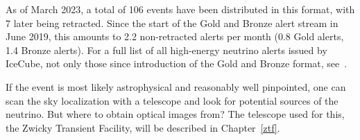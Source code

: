 As of March 2023, a total of 106 events have been distributed in this format, with 7 later being retracted. Since the start of the Gold and Bronze alert stream in June 2019, this amounts to 2.2 non-retracted alerts per month (0.8 Gold alerts, 1.4 Bronze alerts). For a full list of all high-energy neutrino alerts issued by IceCube, not only those since introduction of the Gold and Bronze format, see~\cite{Abbasi2023}.

If the event is most likely astrophysical and reasonably well pinpointed, one can scan the sky localization with a telescope and look for potential sources of the neutrino. But where to obtain optical images from? The telescope used for this, the Zwicky Transient Facility, will be described in Chapter~\ref{ztf}.



